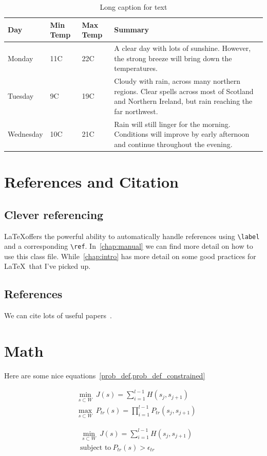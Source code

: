 \begin{table}
\begin{center}
    \begin{tabular}{ | l | l | l | p{5cm} |}
    \hline
    Day & Min Temp & Max Temp & Summary \\ \hline
    Monday & 11C & 22C & A clear day with lots of sunshine.  
    However, the strong breeze will bring down the temperatures. \\ \hline
    Tuesday & 9C & 19C & Cloudy with rain, across many northern regions. Clear spells 
    across most of Scotland and Northern Ireland, 
    but rain reaching the far northwest. \\ \hline
    Wednesday & 10C & 21C & Rain will still linger for the morning. 
    Conditions will improve by early afternoon and continue 
    throughout the evening. \\
    \hline
    \end{tabular}
    \caption[Short caption for table]{Long caption for text \label{tab:table}}
    \end{center}
\end{table}
\lipsum

\section{References and Citation}

\subsection{Clever referencing}
\LaTeX offers the powerful ability to automatically handle references using \verb+\label+ and a corresponding \verb+\ref+.
In~\cref{chap:manual} we can find more detail on how to use this class file.
While~\cref{chap:intro} has more detail on some good practices for \LaTeX~that I've picked up.

\lipsum[9]

\subsection{References}

We can cite lots of useful papers~\cite{bhat2000,chaturvedi2011a}.

\section{Math}

\lipsum[9]

Here are some nice equations~\cref{prob_def,prob_def_constrained}

\begin{align}
\label{prob_def}
&\min_{s\subset W}\ J(s) = \sum_{i=1}^{l-1} H(s_j, s_{j+1}) \\
&\max_{s\subset W}\ P_{tr}(s) = \prod_{i=1}^{l-1} P_{tr}(s_j, s_{j+1}) \nonumber
\end{align}

\begin{align}
\label{prob_def_constrained}
&\min_{s\subset W}\ J(s) = \sum_{i=1}^{l-1} H(s_j, s_{j+1}) \\
&\text{subject to} \ P_{tr}(s)>\epsilon_{tr} \nonumber
\end{align}
